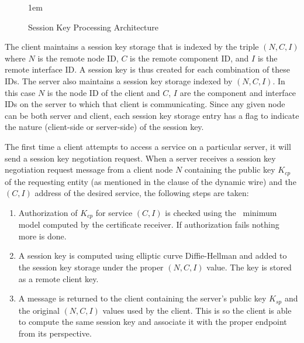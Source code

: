 \begin{figure}[htbp]
  
  \centerline{\raise 1em\box\graph}
  \caption{Session Key Processing Architecture}
  \label{figure-sessionkey-daemon}
\end{figure}

The client maintains a session key storage that is indexed by the triple $(N, C, I)$ where $N$
is the remote node ID, $C$ is the remote component ID, and $I$ is the remote interface ID. A
session key is thus created for each combination of these IDs. The server also maintains a
session key storage indexed by $(N, C, I)$. In this case $N$ is the node ID of the client and
$C$, $I$ are the component and interface IDs on the server to which that client is
communicating. Since any given node can be both server and client, each session key storage
entry has a flag to indicate the nature (client-side or server-side) of the session key.

%

The first time a client attempts to access a service on a particular server, it will send a
session key negotiation request. When a server receives a session key negotiation request
message from a client node $N$ containing the public key $K_{cp}$ of the requesting entity (as
mentioned in the  clause of the dynamic wire) and the $(C, I)$ address of the desired
service, the following steps are taken:
\begin{enumerate}
\item Authorization of $K_{cp}$ for service $(C, I)$ is checked using the \RT\ minimum model
  computed by the certificate receiver. If authorization fails nothing more is done.
\item A session key is computed using elliptic curve Diffie-Hellman and added to the session key
  storage under the proper $(N, C, I)$ value. The key is stored as a remote client key.
\item A message is returned to the client containing the server's public key $K_{sp}$ and the
  original $(N, C, I)$ values used by the client. This is so the client is able to compute the
  same session key and associate it with the proper endpoint from its perspective.
\end{enumerate}

